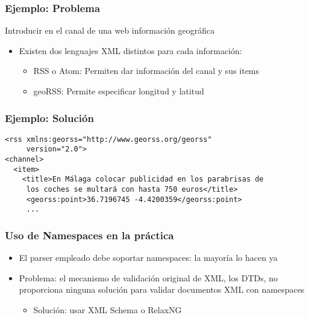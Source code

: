 
\begin{frame}
\frametitle{Ejemplo: Problema}

Introducir en el canal de una web información geográfica
\begin{itemize}
\item Existen dos lenguajes XML distintos para cada información:
  \begin{itemize}
  \item RSS o Atom: Permiten dar información del canal y sus items
  \item geoRSS: Permite especificar longitud y latitud
  \end{itemize}
\end{itemize}

\end{frame}


\begin{frame}[fragile]
\frametitle{Ejemplo: Solución}

\begin{verbatim}
<rss xmlns:georss="http://www.georss.org/georss" 
     version="2.0">
<channel>
  <item>
    <title>En Málaga colocar publicidad en los parabrisas de
     los coches se multará con hasta 750 euros</title>
     <georss:point>36.7196745 -4.4200359</georss:point>
     ...
\end{verbatim}

\end{frame}


\begin{frame}
\frametitle{Uso de Namespaces en la práctica}

\begin{itemize}
\item El parser empleado debe soportar namespaces: la mayoría lo hacen ya
\item Problema: el mecanismo de validación original de XML, los DTDs, no 
  proporciona ninguna solución para validar documentos XML con namespaces
  \begin{itemize}
  \item Solución: usar XML Schema o RelaxNG
  \end{itemize}
\end{itemize}
\end{frame}



